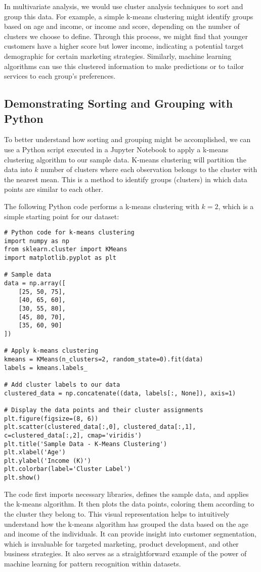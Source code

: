 \documentclass{book}
\begin{document}
In multivariate analysis, we would use cluster analysis techniques to sort and group this data. For example, a simple k-means clustering might identify groups based on age and income, or income and score, depending on the number of clusters we choose to define. Through this process, we might find that younger customers have a higher score but lower income, indicating a potential target demographic for certain marketing strategies. Similarly, machine learning algorithms can use this clustered information to make predictions or to tailor services to each group's preferences.

\subsection{Demonstrating Sorting and Grouping with Python}
To better understand how sorting and grouping might be accomplished, we can use a Python script executed in a Jupyter Notebook to apply a k-means clustering algorithm to our sample data. K-means clustering will partition the data into $k$ number of clusters where each observation belongs to the cluster with the nearest mean. This is a method to identify groups (clusters) in which data points are similar to each other.

The following Python code performs a k-means clustering with $k=2$, which is a simple starting point for our dataset:

\begin{verbatim}
# Python code for k-means clustering
import numpy as np
from sklearn.cluster import KMeans
import matplotlib.pyplot as plt

# Sample data
data = np.array([
    [25, 50, 75],
    [40, 65, 60],
    [30, 55, 80],
    [45, 80, 70],
    [35, 60, 90]
])

# Apply k-means clustering
kmeans = KMeans(n_clusters=2, random_state=0).fit(data)
labels = kmeans.labels_

# Add cluster labels to our data
clustered_data = np.concatenate((data, labels[:, None]), axis=1)

# Display the data points and their cluster assignments
plt.figure(figsize=(8, 6))
plt.scatter(clustered_data[:,0], clustered_data[:,1], c=clustered_data[:,2], cmap='viridis')
plt.title('Sample Data - K-Means Clustering')
plt.xlabel('Age')
plt.ylabel('Income (K)')
plt.colorbar(label='Cluster Label')
plt.show()
\end{verbatim}

The code first imports necessary libraries, defines the sample data, and applies the k-means algorithm. It then plots the data points, coloring them according to the cluster they belong to. This visual representation helps to intuitively understand how the k-means algorithm has grouped the data based on the age and income of the individuals. It can provide insight into customer segmentation, which is invaluable for targeted marketing, product development, and other business strategies. It also serves as a straightforward example of the power of machine learning for pattern recognition within datasets.
\end{document}
